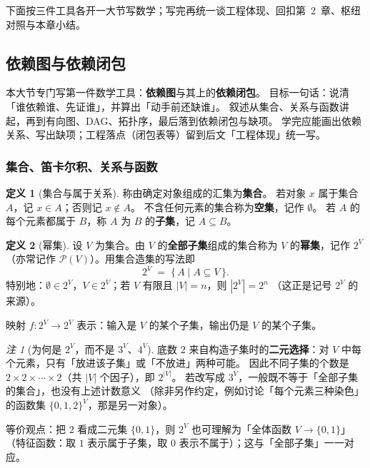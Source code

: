 \documentclass[UTF8,a4paper,11pt]{ctexart}
\theoremstyle{definition}
\newtheorem{definition}{定义}[section]
\theoremstyle{plain}
\theoremstyle{remark}
\newtheorem{remark}{注}[section]
\numberwithin{figure}{section}
\numberwithin{table}{section}
\begin{document}
下面按三件工具各开一大节写数学；写完再统一谈工程体现、回扣第~2~章、枢纽对照与本章小结。

\subsection{依赖图与依赖闭包}
\label{sec:tool-dep}

本大节专门写第一件数学工具：\textbf{依赖图}与其上的\textbf{依赖闭包}。
目标一句话：说清「谁依赖谁、先证谁」，并算出「动手前还缺谁」。
叙述从集合、关系与函数讲起，再到有向图、DAG、拓扑序，最后落到依赖闭包与缺项。
学完应能画出依赖关系、写出缺项；工程落点（闭包表等）留到后文「工程体现」统一写。

\subsubsection{集合、笛卡尔积、关系与函数}
\label{sec:set-rel}

\begin{definition}[集合与属于关系]
称由确定对象组成的汇集为\textbf{集合}。
若对象 $x$ 属于集合 $A$，记 $x\in A$；否则记 $x\notin A$。
不含任何元素的集合称为\textbf{空集}，记作 $\emptyset$。
若 $A$ 的每个元素都属于 $B$，称 $A$ 为 $B$ 的\textbf{子集}，记 $A\subseteq B$。
\end{definition}

\begin{definition}[幂集]
设 $V$ 为集合。由 $V$ 的\textbf{全部子集}组成的集合称为 $V$ 的\textbf{幂集}，记作 $2^{V}$
（亦常记作 $\mathcal{P}(V)$）。用集合造集的写法即
\[
2^{V}
\;=\;
\{\,A\mid A\subseteq V\,\}.
\]
特别地：$\emptyset\in 2^{V}$，$V\in 2^{V}$；若 $V$ 有限且 $|V|=n$，则 $|2^{V}|=2^{n}$
（这正是记号 $2^{V}$ 的来源）。

映射 $f:2^{V}\to 2^{V}$ 表示：输入是 $V$ 的某个子集，输出仍是 $V$ 的某个子集。
\end{definition}

\begin{remark}[为何是 $2^{V}$，而不是 $3^{V}$、$4^{V}$]
底数 $2$ 来自构造子集时的\textbf{二元选择}：对 $V$ 中每个元素，只有「放进该子集」或「不放进」两种可能。
因此不同子集的个数是 $2\times 2\times\cdots\times 2$（共 $|V|$ 个因子），即 $2^{|V|}$。
若改写成 $3^{V}$，一般既不等于「全部子集的集合」，也没有上述计数意义
（除非另作约定，例如讨论「每个元素三种染色」的函数集 $\{0,1,2\}^{V}$，那是另一对象）。

等价观点：把 $2$ 看成二元集 $\{0,1\}$，则 $2^{V}$ 也可理解为「全体函数 $V\to\{0,1\}$」
（特征函数：取 $1$ 表示属于子集，取 $0$ 表示不属于）；这与「全部子集」一一对应。
\end{remark}
\end{document}
